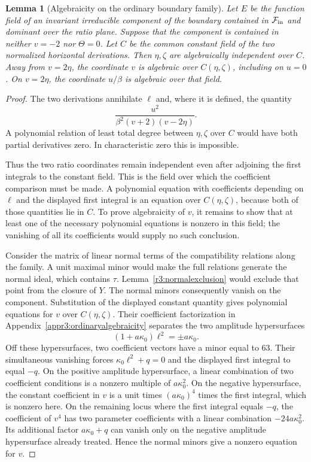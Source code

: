 \documentclass[11pt,a4paper]{article}
\numberwithin{equation}{section}
\theoremstyle{plain}
\newtheorem{lemma}[theorem]{Lemma}
\theoremstyle{definition}
\theoremstyle{remark}
\begin{document}
\begin{lemma}[Algebraicity on the ordinary boundary family]
\label{r3:ordinaryalgebraicity}
Let $E$ be the function field of an invariant irreducible component of the boundary contained in $\mathcal F_{\rm in}$ and dominant
over the ratio plane. Suppose that the component is contained in
neither $v=-2$ nor $\Theta=0$. Let $C$ be the common constant field of
the two normalized horizontal derivations. Then $\eta,\zeta$ are
algebraically independent over $C$. Away from $v=2\eta$, the coordinate
$v$ is algebraic over $C(\eta,\zeta)$, including on $u=0$.
On $v=2\eta$, the coordinate $u/\beta$ is algebraic over that field.
\end{lemma}
\begin{proof}
The two derivations annihilate $\ell$ and, where it is defined, the
quantity
\[
 \frac{u^2}{\beta^2(v+2)(v-2\eta)}.
\]
A polynomial relation of least total degree between $\eta,\zeta$
over $C$ would have both partial derivatives zero. In characteristic
zero this is impossible.

Thus the two ratio coordinates remain independent even after
adjoining the first integrals to the constant field. This is the
field over which the coefficient comparison must be made. A
polynomial equation with coefficients depending on $\ell$ and the
displayed first integral is an equation over
$C(\eta,\zeta)$, because both of those quantities lie in $C$.
To prove algebraicity of $v$, it remains to show that at least one
of the necessary polynomial equations is nonzero in this field;
the vanishing of all its coefficients would supply no such
conclusion.

Consider the matrix of linear normal terms of the compatibility
relations along the family. A unit maximal minor would make the full
relations generate the normal ideal, which contains $\tau$.
Lemma~\ref{r3:normalexclusion} would exclude that point from the
closure of $Y$. The normal
minors consequently vanish on the component. Substitution of
the displayed constant quantity gives polynomial equations for $v$
over $C(\eta,\zeta)$. Their coefficient factorization in
Appendix~\ref{appr3:ordinaryalgebraicity} separates the two amplitude
hypersurfaces
\[
 (1+a\kappa_0)\ell^2=\pm a\kappa_0.
\]
Off these hypersurfaces, two coefficient vectors have a minor equal
to $63$. Their simultaneous vanishing forces
$\kappa_0\ell^2+q=0$ and the displayed first integral to equal $-q$.
On the positive amplitude hypersurface, a linear combination of two
coefficient conditions is a nonzero multiple of $a\kappa_0^2$.
On the negative hypersurface, the constant coefficient in $v$ is a
unit times $(a\kappa_0)^4$ times the first integral, which is nonzero
here. On the remaining locus where the first integral equals $-q$,
the coefficient of $v^4$ has two parameter coefficients with a
linear combination $-24a\kappa_0^2$. Its additional factor
$a\kappa_0+q$ can vanish only on the negative amplitude hypersurface
already treated. Hence the normal minors give a nonzero equation
for $v$.


\end{proof}
\end{document}
